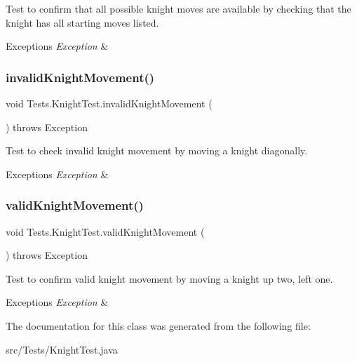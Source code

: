 Test to confirm that all possible knight moves are available by checking that the knight has all starting moves listed. 
\begin{DoxyExceptions}{Exceptions}
{\em Exception} & \\
\hline
\end{DoxyExceptions}
\hypertarget{class_tests_1_1_knight_test_a2055e2c815f2c80d89a9f9519702b712}{}\label{class_tests_1_1_knight_test_a2055e2c815f2c80d89a9f9519702b712} 
\subsubsection{\texorpdfstring{invalid\+Knight\+Movement()}{invalidKnightMovement()}}
{\footnotesize\ttfamily void Tests.\+Knight\+Test.\+invalid\+Knight\+Movement (\begin{DoxyParamCaption}{ }\end{DoxyParamCaption}) throws Exception}

Test to check invalid knight movement by moving a knight diagonally. 
\begin{DoxyExceptions}{Exceptions}
{\em Exception} & \\
\hline
\end{DoxyExceptions}
\hypertarget{class_tests_1_1_knight_test_aeef4aecba7d22407c8945dabf02ae3fa}{}\label{class_tests_1_1_knight_test_aeef4aecba7d22407c8945dabf02ae3fa} 
\subsubsection{\texorpdfstring{valid\+Knight\+Movement()}{validKnightMovement()}}
{\footnotesize\ttfamily void Tests.\+Knight\+Test.\+valid\+Knight\+Movement (\begin{DoxyParamCaption}{ }\end{DoxyParamCaption}) throws Exception}

Test to confirm valid knight movement by moving a knight up two, left one. 
\begin{DoxyExceptions}{Exceptions}
{\em Exception} & \\
\hline
\end{DoxyExceptions}


The documentation for this class was generated from the following file\+:\begin{DoxyCompactItemize}
\item 
src/\+Tests/Knight\+Test.\+java\end{DoxyCompactItemize}
